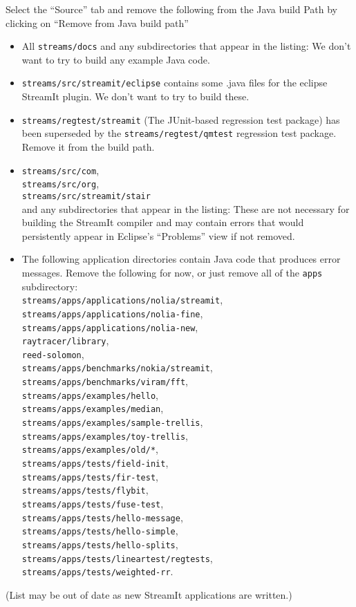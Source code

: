 \documentclass[11pt]{article}
\begin{document}
Select the ``Source'' tab and remove the following from the Java build
Path by clicking on ``Remove from Java build path''
\begin{itemize}
\item All {\tt streams/docs} and any subdirectories that appear in the listing:
 We don't want to try to build any example Java code.
\item {\tt streams/src/streamit/eclipse} contains some .java files for the
eclipse StreamIt plugin.
We don't want to try to build these. 
\item {\tt streams/regtest/streamit} (The JUnit-based regression test
  package) has been superseded by the {\tt streams/regtest/qmtest}
  regression test package.  Remove it from the build path.
\item {\tt streams/src/com},\\
 {\tt streams/src/org},\\ 
 {\tt streams/src/streamit/stair}\\
 and any subdirectories that appear in the listing:
 These are not necessary for building the StreamIt compiler and may contain
 errors that would persistently appear in Eclipse's ``Problems'' view
 if not removed. 
\item The following application directories contain Java code that
  produces error messages. Remove the following for now, or just remove all of
  the {\tt apps} subdirectory:\\
  {\tt streams/apps/applications/nolia/streamit},\\
  {\tt streams/apps/applications/nolia-fine},\\
  {\tt  streams/apps/applications/nolia-new},\\ 
  {\tt raytracer/library},\\
  {\tt reed-solomon},\\
  {\tt streams/apps/benchmarks/nokia/streamit},\\
  {\tt streams/apps/benchmarks/viram/fft},\\
  {\tt streams/apps/examples/hello},\\
  {\tt streams/apps/examples/median},\\
  {\tt streams/apps/examples/sample-trellis},\\
  {\tt streams/apps/examples/toy-trellis},\\
  {\tt streams/apps/examples/old/*},\\
  {\tt streams/apps/tests/field-init},\\
  {\tt streams/apps/tests/fir-test},\\
  {\tt streams/apps/tests/flybit},\\
  {\tt streams/apps/tests/fuse-test},\\
  {\tt streams/apps/tests/hello-message},\\
  {\tt streams/apps/tests/hello-simple},\\
  {\tt streams/apps/tests/hello-splits},\\
  {\tt streams/apps/tests/lineartest/regtests},\\
  {\tt streams/apps/tests/weighted-rr}.
\end{itemize}
(List may be out of date as new StreamIt applications are written.)
\end{document}

